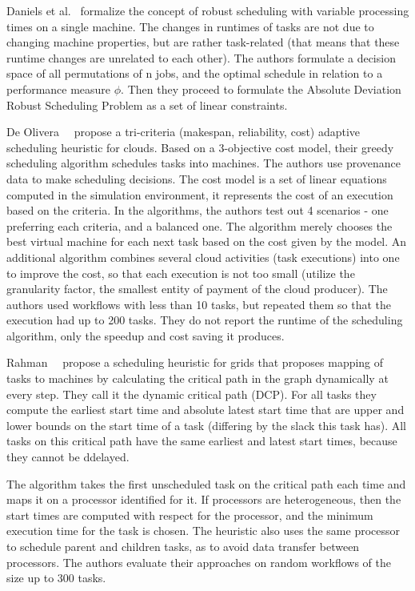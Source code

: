 \documentclass[sigconf,review,anonymous]{acmart}
\begin{document}
    Daniels et al.~\cite{daniels1995robust} formalize the concept of robust scheduling with variable processing times
    on a single machine.
    The changes in runtimes of tasks are not due to changing machine properties, but are rather task-related (that means
    that these runtime changes are unrelated to each other).
    The authors formulate a decision space of all permutations of n jobs, and the optimal schedule in relation to a
    performance measure $\phi$.
    Then they proceed to formulate the Absolute Deviation Robust Scheduling Problem as a set of linear constraints.

    De Olivera~\etal~\cite{de2012provenance} propose a tri-criteria (makespan, reliability, cost) adaptive scheduling heuristic
    for clouds.
    Based on a 3-objective cost model, their greedy scheduling algorithm schedules tasks into machines.
    The authors use provenance data to make scheduling decisions.
    The cost model is a set of linear equations computed in the simulation environment, it represents the cost of an execution based on the criteria.
    In the algorithms, the authors test out 4 scenarios - one preferring each criteria, and a balanced one.
    The algorithm merely chooses the best virtual machine for each next task based on the cost given by the model.
    An additional algorithm combines several cloud activities (task executions) into one to improve the cost, so that each
    execution is not too small (utilize the granularity factor, the smallest entity of payment of the cloud producer).
    The authors used workflows with less than 10 tasks, but repeated them so that the execution had up to 200 tasks.
    They do not report the runtime of the scheduling algorithm, only the speedup and cost saving it produces.

    Rahman~\etal~\cite{rahman2013} propose a scheduling heuristic for grids that proposes mapping of tasks to machines by calculating
    the critical path in the graph dynamically at every step.
    They call it the dynamic critical path (DCP).
    For all tasks they compute the earliest start time and absolute latest start time that are upper and lower bounds
    on the start time of a task (differing by the slack this task has).
    All tasks on this critical path have the same earliest and latest start times, because they cannot be ddelayed.

    The algorithm takes the first unscheduled task on the critical path each time and maps it on a processor identified for it.
    If processors are heterogeneous, then the start times are computed with respect for the processor, and the minimum execution time for
    the task is chosen.
    The heuristic also uses the same processor to schedule parent and children tasks, as to avoid data transfer between processors.
    The authors evaluate their approaches on random workflows of the size up to 300 tasks.
\end{document}
